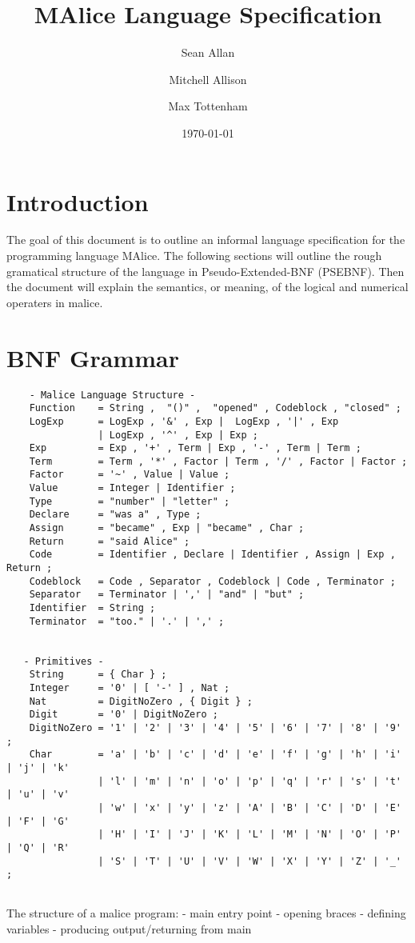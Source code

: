 \documentclass[a4wide, 11pt]{article}
\begin{document}
\title{MAlice Language Specification}

\author{Sean Allan \and Mitchell Allison \and Max Tottenham}

\date{\today}         %

\maketitle            %

\section{Introduction}

The goal of this document is to outline an informal language specification for 
the programming language MAlice. The following sections will outline the rough
gramatical structure of the language in Pseudo-Extended-BNF (PSEBNF). Then the 
document will explain the semantics, or meaning, of the logical and numerical 
operaters in malice.

\section{BNF Grammar} 

\begin{verbatim}
    - Malice Language Structure - 
    Function    = String ,  "()" ,  "opened" , Codeblock , "closed" ;
    LogExp      = LogExp , '&' , Exp |  LogExp , '|' , Exp 
	            | LogExp , '^' , Exp | Exp ;
    Exp         = Exp , '+' , Term | Exp , '-' , Term | Term ;
    Term        = Term , '*' , Factor | Term , '/' , Factor | Factor ;
    Factor      = '~' , Value | Value ;
    Value       = Integer | Identifier ;
    Type        = "number" | "letter" ;
    Declare     = "was a" , Type ;
    Assign      = "became" , Exp | "became" , Char ;
    Return      = "said Alice" ;
    Code        = Identifier , Declare | Identifier , Assign | Exp , Return ;
    Codeblock   = Code , Separator , Codeblock | Code , Terminator ; 
    Separator   = Terminator | ',' | "and" | "but" ; 
    Identifier  = String ;
    Terminator  = "too." | '.' | ',' ;
    

   - Primitives -
    String      = { Char } ;
    Integer     = '0' | [ '-' ] , Nat ;
    Nat         = DigitNoZero , { Digit } ;
    Digit       = '0' | DigitNoZero ; 
    DigitNoZero = '1' | '2' | '3' | '4' | '5' | '6' | '7' | '8' | '9' ;
    Char        = 'a' | 'b' | 'c' | 'd' | 'e' | 'f' | 'g' | 'h' | 'i' | 'j' | 'k' 
                | 'l' | 'm' | 'n' | 'o' | 'p' | 'q' | 'r' | 's' | 't' | 'u' | 'v'
                | 'w' | 'x' | 'y' | 'z' | 'A' | 'B' | 'C' | 'D' | 'E' | 'F' | 'G'
                | 'H' | 'I' | 'J' | 'K' | 'L' | 'M' | 'N' | 'O' | 'P' | 'Q' | 'R'
                | 'S' | 'T' | 'U' | 'V' | 'W' | 'X' | 'Y' | 'Z' | '_' ;
 
\end{verbatim}
The structure of a malice program:
	- main entry point
	- opening braces
	- defining variables
	- producing output/returning from main
\end{document}
